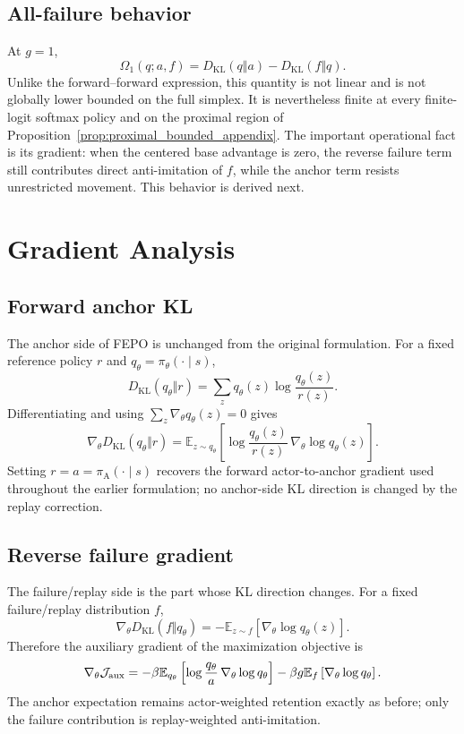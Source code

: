 \documentclass{article}
\newcommand{\anchorpol}{\pi_{\mathrm A}}
\newcommand{\KL}{D_{\mathrm{KL}}}
\newcommand{\E}{\mathbb{E}}
\newcommand{\FEPO}{\textsc{FEPO}\xspace}
\begin{document}
\subsection{All-failure behavior}
At $g=1$,
\begin{equation}
\Omega_1(q;a,f)=\KL(q\Vert a)-\KL(f\Vert q).
\end{equation}
Unlike the forward--forward expression, this quantity is not linear and is not globally lower bounded on the full simplex. It is nevertheless finite at every finite-logit softmax policy and on the proximal region of Proposition~\ref{prop:proximal_bounded_appendix}. The important operational fact is its gradient: when the centered base advantage is zero, the reverse failure term still contributes direct anti-imitation of $f$, while the anchor term resists unrestricted movement. This behavior is derived next.

\section{Gradient Analysis}
\label{app:gradient}

\subsection{Forward anchor KL}
The anchor side of \FEPO is unchanged from the original formulation. For a fixed reference policy $r$ and $q_\theta=\pi_\theta(\cdot\mid s)$,
\begin{equation}
D_{\mathrm{KL}}(q_\theta\Vert r)=\sum_z q_\theta(z)\log\frac{q_\theta(z)}{r(z)}.
\end{equation}
Differentiating and using $\sum_z\nabla_\theta q_\theta(z)=0$ gives
\begin{equation}
\nabla_\theta D_{\mathrm{KL}}(q_\theta\Vert r)
=\E_{z\sim q_\theta}\!\left[
\log\frac{q_\theta(z)}{r(z)}\,\nabla_\theta\log q_\theta(z)
\right].
\label{eq:anchor_klgrad}
\end{equation}
Setting $r=a=\anchorpol(\cdot\mid s)$ recovers the forward actor-to-anchor gradient used throughout the earlier formulation; no anchor-side KL direction is changed by the replay correction.

\subsection{Reverse failure gradient}
The failure/replay side is the part whose KL direction changes. For a fixed failure/replay distribution $f$,
\begin{equation}
\nabla_\theta\KL(f\Vert q_\theta)
=-\E_{z\sim f}\left[\nabla_\theta\log q_\theta(z)\right].
\label{eq:reverse_klgrad}
\end{equation}
Therefore the auxiliary gradient of the maximization objective is
\begin{equation}
\nabla_\theta\mathcal J_{\rm aux}
=-\beta\E_{q_\theta}\left[\log\frac{q_\theta}{a}\,\nabla_\theta\log q_\theta\right]
-\beta g\E_f\left[\nabla_\theta\log q_\theta\right].
\label{eq:fepo_grad_general}
\end{equation}
The anchor expectation remains actor-weighted retention exactly as before; only the failure contribution is replay-weighted anti-imitation.
\end{document}
